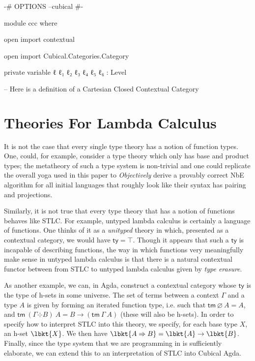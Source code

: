 \begin{code}[hide]
{-# OPTIONS --cubical #-}

module ccc where

open import contextual

open import Cubical.Categories.Category

private
  variable
    ℓ ℓ₁ ℓ₂ ℓ₃ ℓ₄ ℓ₅ ℓ₆ : Level

-- Here is a definition of a Cartesian Closed Contextual Category
\end{code}

\section{Theories For Lambda Calculus}

It is not the case that every single type theory has a notion of function types.
One, could, for example, consider a type theory which only has base and product
types; the metatheory of such a type system is non-trivial and one could
replicate the overall yoga used in this paper to \emph{Objectively} derive a
provably correct NbE algorithm for all initial languages that roughly look like
their syntax has pairing and projections.

Similarly, it is not true that every type theory that has a notion of functions
behaves like STLC. For example, untyped lambda calculus is certainly a language
of functions. One thinks of it as a \emph{unityped} theory in which, presented
as a contextual category, we would have $\mathsf{ty} = \top$. Though it appears
that such a $\mathsf{ty}$ is incapable of describing functions, the way in which
functions very meaningfully make sense in untyped lambda calculus is that there
is a natural contextual functor between from STLC to untyped lambda calculus
given by \emph{type erasure}.

As another example, we can, in Agda, construct a contextual category whose
$\mathsf{ty}$ is the type of h-sets in some universe. The set of terms between a
context $\Gamma$ and a type $A$ is given by forming an iterated function type,
i.e. such that $\mathsf{tm}~\varnothing~A = A$, and $\mathsf{tm}~(\Gamma
\hermitmatrix B)~A = B \to (\mathsf{tm}~\Gamma~A)$ (these will also be h-sets).
In order to specify how to interpret STLC into this theory, we specify, for each
base type $X$, an h-set $\lbkt{X}$. We then have $\lbkt{A \Rightarrow B} =
\lbkt{A} \to \lbkt{B}$. Finally, since the type system that we are programming
in is sufficiently elaborate, we can extend this to an interpretation of STLC
into Cubical Agda.
\iffalse
(Of course, if we interpret a base type $X$ as the set
$\mathbb{N}$, then the successor function $\mathbb{N} \to \mathbb{N}$ will not
be the interpretation of any closed STLC term of type $X \to X$, so we are
interpreting into a much stronger, dependently typed, theory.)
\fi


